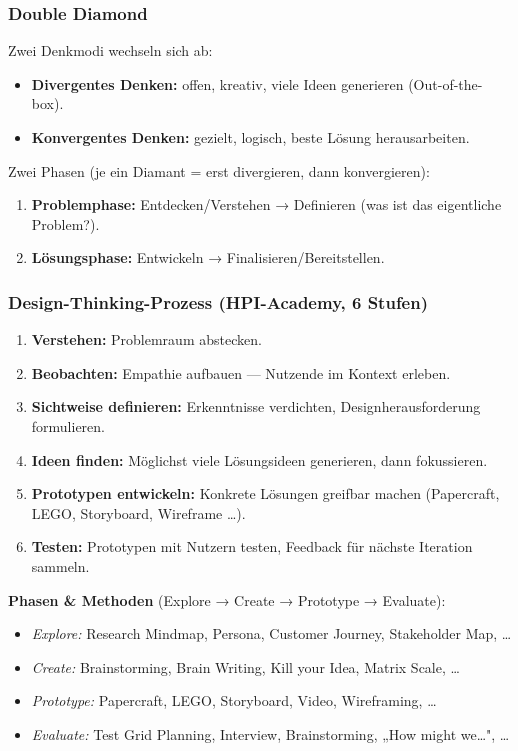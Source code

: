 \documentclass[12pt, a4paper]{article}
\begin{document}
\subsubsection*{Double Diamond}

Zwei Denkmodi wechseln sich ab:
\begin{itemize}
  \item \textbf{Divergentes Denken:} offen, kreativ, viele Ideen generieren (Out-of-the-box).
  \item \textbf{Konvergentes Denken:} gezielt, logisch, beste Lösung herausarbeiten.
\end{itemize}

Zwei Phasen (je ein Diamant = erst divergieren, dann konvergieren):
\begin{enumerate}
  \item \textbf{Problemphase:} Entdecken/Verstehen → Definieren (was ist das eigentliche Problem?).
  \item \textbf{Lösungsphase:} Entwickeln → Finalisieren/Bereitstellen.
\end{enumerate}

\subsubsection*{Design-Thinking-Prozess (HPI-Academy, 6 Stufen)}

\begin{enumerate}
  \item \textbf{Verstehen:} Problemraum abstecken.
  \item \textbf{Beobachten:} Empathie aufbauen — Nutzende im Kontext erleben.
  \item \textbf{Sichtweise definieren:} Erkenntnisse verdichten, Designherausforderung formulieren.
  \item \textbf{Ideen finden:} Möglichst viele Lösungsideen generieren, dann fokussieren.
  \item \textbf{Prototypen entwickeln:} Konkrete Lösungen greifbar machen (Papercraft, LEGO, Storyboard, Wireframe \dots).
  \item \textbf{Testen:} Prototypen mit Nutzern testen, Feedback für nächste Iteration sammeln.
\end{enumerate}

\textbf{Phasen \& Methoden} (Explore → Create → Prototype → Evaluate):
\begin{itemize}
  \item \textit{Explore:} Research Mindmap, Persona, Customer Journey, Stakeholder Map, \dots
  \item \textit{Create:} Brainstorming, Brain Writing, Kill your Idea, Matrix Scale, \dots
  \item \textit{Prototype:} Papercraft, LEGO, Storyboard, Video, Wireframing, \dots
  \item \textit{Evaluate:} Test Grid Planning, Interview, Brainstorming, „How might we\dots", \dots
\end{itemize}
\end{document}

